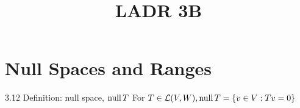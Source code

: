 \documentclass[12pt, letterpaper]{article}
\title{LADR 3B}
\begin{document}
\maketitle

\section*{Null Spaces and Ranges}

\begin{imp}
{3.12 Definition: null space, $\operatorname{null} T$}
For $T\in\mathcal{L}(V,W),\operatorname{null} T=\{v\in V:Tv=0\}$
\end{imp}

\end{document}
